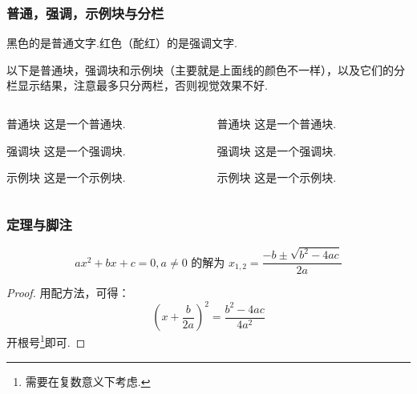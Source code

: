 \documentclass{beamer}
\begin{document}
\begin{frame}
    \frametitle{普通，强调，示例块与分栏}
    黑色的是普通文字.红色（酡红）的是\alert{强调}文字. \pause

    以下是普通块，强调块和示例块（主要就是上面线的颜色不一样），以及它们的分栏显示结果，注意\alert{最多只分两栏}，否则视觉效果不好.
    \begin{columns}
        \begin{column}{4cm}
            \begin{block}{普通块}
                这是一个普通块. \pause
            \end{block}

            \begin{alertblock}{强调块}
                这是一个强调块. \pause
            \end{alertblock}

            \begin{exampleblock}{示例块}
                这是一个示例块. \pause
            \end{exampleblock}
        \end{column}

        \begin{column}{4cm}
            \begin{block}{普通块}
                这是一个普通块. \pause
            \end{block}

            \begin{alertblock}{强调块}
                这是一个强调块. \pause
            \end{alertblock}

            \begin{exampleblock}{示例块}
                这是一个示例块. \pause
            \end{exampleblock}
        \end{column}
    \end{columns}

\end{frame}

\begin{frame}
    \frametitle{定理与脚注}
    \begin{theorem}[一元二次方程的解]
    \begin{equation*}
        a x^2 + b x + c = 0, a \neq 0 \mbox{~的解为~} x_{1, 2} = \frac{-b \pm \sqrt{b^2 - 4 a c}}{2 a} 
    \end{equation*}
    \end{theorem}
    \begin{proof}
        用配方法，可得：
        \begin{equation*}
            (x + \frac{b}{2a})^2 = \frac{b^2 - 4 a c}{4a^2}
        \end{equation*}
        开根号\footnote{需要在复数意义下考虑.}即可.
    \end{proof}
\end{frame}
\end{document}
